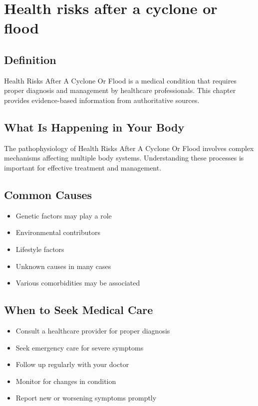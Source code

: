 
\chapter{Health risks after a cyclone or flood}

\section*{Definition}
Health Risks After A Cyclone Or Flood is a medical condition that requires proper diagnosis and management by healthcare professionals. This chapter provides evidence-based information from authoritative sources.

\section*{What Is Happening in Your Body}
The pathophysiology of Health Risks After A Cyclone Or Flood involves complex mechanisms affecting multiple body systems. Understanding these processes is important for effective treatment and management.

\section*{Common Causes}
\begin{itemize}
  \item Genetic factors may play a role
  \item Environmental contributors
  \item Lifestyle factors
  \item Unknown causes in many cases
  \item Various comorbidities may be associated
\end{itemize}

\section*{When to Seek Medical Care}
\begin{itemize}
  \item Consult a healthcare provider for proper diagnosis
  \item Seek emergency care for severe symptoms
  \item Follow up regularly with your doctor
  \item Monitor for changes in condition
  \item Report new or worsening symptoms promptly
\end{itemize}

